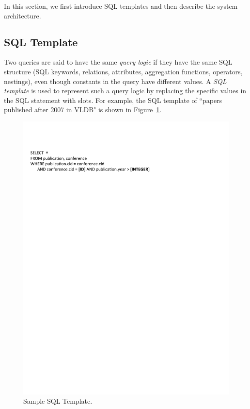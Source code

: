 \documentclass{vldb}
\begin{document}
In this section, we first introduce SQL templates and then describe the system architecture.  

\subsection{SQL Template}
\label{subsec:SQLTemplate}
Two queries are said to have the same {\em query logic} if they have the same SQL structure (SQL keywords, relations, attributes, aggregation functions, operators, nestings), even though constants in the query have different values.  A {\em SQL template} is used to represent such a query logic by replacing the specific values in the SQL statement with slots.  For example, the SQL template of ``papers published after 2007 in VLDB" is shown in Figure~\ref{fig:sampleTemplate}. 

\begin{figure}[h]
\center
\includegraphics[width=1\linewidth]{pic/sampleTemplate.pdf}
\caption{Sample SQL Template.}
\label{fig:sampleTemplate}
\end{figure}
\end{document}
